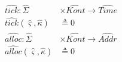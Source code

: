 \documentclass[12pt,draft]{article}
\begin{document}
\begin{multicols*}{2}
  \begin{align*}
    \widehat{tick}:\widehat{\Sigma}
    &\times \widehat{\textit{Kont}} \rightarrow \widehat{\textit{Time}} \\
    \widehat{tick}(\hat{\varsigma}, \hat{\kappa}) &\triangleq 0 \\
    \widehat{alloc}:\hat{\Sigma}
    &\times \widehat{\textit{Kont}} \rightarrow \widehat{\textit{Addr}} \\
    \widehat{alloc}(\hat{\varsigma}, \hat{\kappa}) &\triangleq 0 \\
  \end{align*}
\end{multicols*}



\newpage

\newpage
\end{document}
